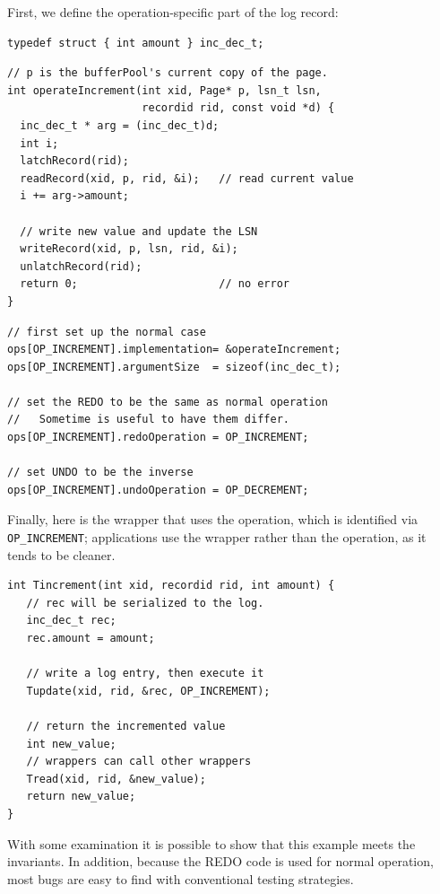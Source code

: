 \documentclass[10pt,letterpaper,twocolumn,english]{article}
\begin{document}
First, we define the operation-specific part of the log record:
\begin{small}
\begin{verbatim}
typedef struct { int amount } inc_dec_t;
\end{verbatim}
\begin{verbatim}
// p is the bufferPool's current copy of the page.
int operateIncrement(int xid, Page* p, lsn_t lsn,
                     recordid rid, const void *d) {
  inc_dec_t * arg = (inc_dec_t)d;
  int i;
  latchRecord(rid); 
  readRecord(xid, p, rid, &i);   // read current value
  i += arg->amount;
  
  // write new value and update the LSN
  writeRecord(xid, p, lsn, rid, &i);
  unlatchRecord(rid); 
  return 0;                      // no error
}
\end{verbatim}
\begin{verbatim}
// first set up the normal case
ops[OP_INCREMENT].implementation= &operateIncrement;
ops[OP_INCREMENT].argumentSize  = sizeof(inc_dec_t);

// set the REDO to be the same as normal operation
//   Sometime is useful to have them differ.
ops[OP_INCREMENT].redoOperation = OP_INCREMENT;

// set UNDO to be the inverse
ops[OP_INCREMENT].undoOperation = OP_DECREMENT;
\end{verbatim}
{\normalsize Finally, here is the wrapper that uses the
operation, which is identified via {\small\tt OP\_INCREMENT};
applications use the wrapper rather than the operation, as it tends to
be cleaner.}
\begin{verbatim}
int Tincrement(int xid, recordid rid, int amount) {
   // rec will be serialized to the log.
   inc_dec_t rec;
   rec.amount = amount;

   // write a log entry, then execute it
   Tupdate(xid, rid, &rec, OP_INCREMENT);

   // return the incremented value
   int new_value;
   // wrappers can call other wrappers
   Tread(xid, rid, &new_value);
   return new_value;
}
\end{verbatim}
\end{small}


With some examination it is possible to show that this example meets
the invariants.  In addition, because the REDO code is used for normal
operation, most bugs are easy to find with conventional testing
strategies.  
\end{document}
